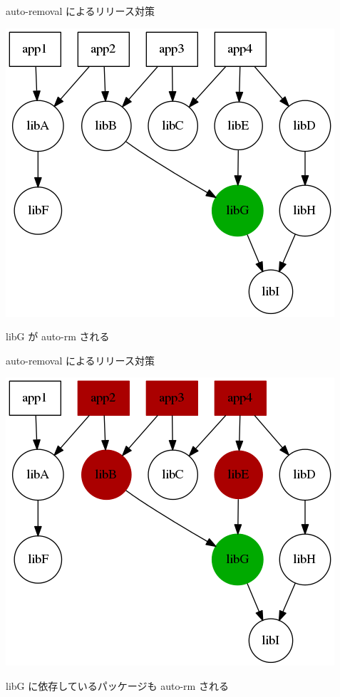 \begin{frame}{auto-removal によるリリース対策}
\begin{center}
\includegraphics[scale=0.4]{image201410/auto-rm2.png}

libG が auto-rm される
\end{center}
\end{frame}

\begin{frame}{auto-removal によるリリース対策}
\begin{center}
\includegraphics[scale=0.4]{image201410/auto-rm3.png}

libG に依存しているパッケージも auto-rm される
\end{center}
\end{frame}

